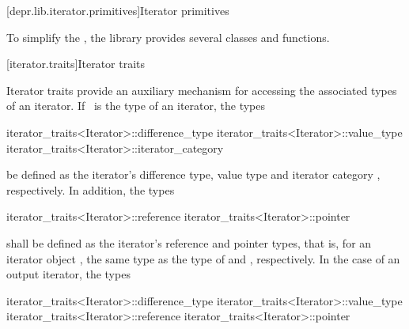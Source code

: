 \documentclass[american,twoside]{book}
\begin{document}
\appendix
\setcounter{chapter}{3}
\begin{paras}

\setcounter{section}{9}
[depr.lib.iterator.primitives]{Iterator primitives}

\textcolor{black}{\pnum}
To simplify the , the library provides
several classes and functions. 

\pnum
{}

\end{paras}

[iterator.traits]{Iterator traits}

\pnum
{}
{Iterator traits provide an auxiliary mechanism for
accessing the associated types of an iterator. If}
\
is the type of an iterator,
the types

\begin{codeblock}
iterator_traits<Iterator>::difference_type
iterator_traits<Iterator>::value_type
iterator_traits<Iterator>::iterator_category
\end{codeblock}

 be defined as the iterator's difference type, value type and iterator
category \addedConcepts{(24.3.3)}, respectively.
In addition, the types

\begin{codeblock}
iterator_traits<Iterator>::reference
iterator_traits<Iterator>::pointer
\end{codeblock}

shall be defined as the iterator's reference and pointer types, that is, for an
iterator object \tcode{a}, the same type as the type of \tcode{*a} and ,
respectively. In the case of an output iterator, the types

\begin{codeblock}
iterator_traits<Iterator>::difference_type
iterator_traits<Iterator>::value_type
iterator_traits<Iterator>::reference
iterator_traits<Iterator>::pointer
\end{codeblock}
\end{document}
